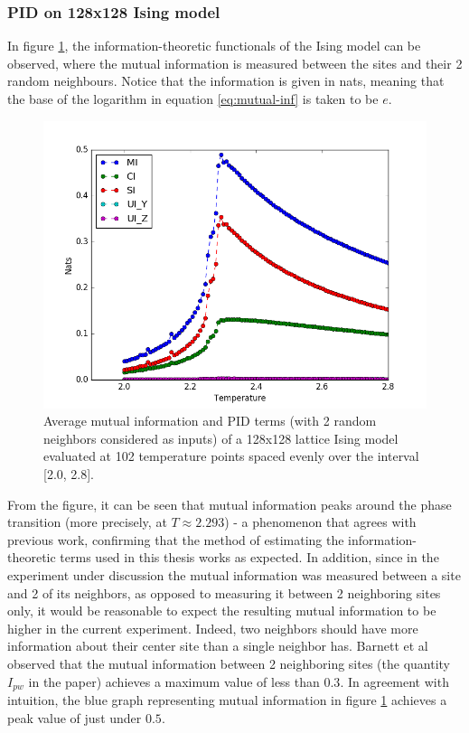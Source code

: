 \documentclass[12pt]{article}
\begin{document}
\subsubsection{PID on 128x128 Ising model}

In figure \ref{fig:ising-128-pid-2-nbs}, the information-theoretic functionals of the Ising model can be observed, where the mutual information is measured between the sites and their 2 random neighbours. Notice that the information is given in nats, meaning that the base of the logarithm in equation \ref{eq:mutual-inf} is taken to be $e$. 

\begin{figure} [h!]
\begin{center}
\includegraphics[width=.9\textwidth]{ising-128-pid-2-nbs}
\caption{Average mutual information and PID terms (with 2 random neighbors considered as inputs) of a 128x128 lattice Ising model evaluated at 102 temperature points spaced evenly over the interval [2.0, 2.8].}
\label{fig:ising-128-pid-2-nbs}
\end{center}
\end{figure}

From the figure, it can be seen that mutual information peaks around the phase transition (more precisely, at $T \approx 2.293$) - a phenomenon that agrees with previous work, confirming that the method of estimating the information-theoretic terms used in this thesis works as expected. In addition, since in the experiment under discussion the mutual information was measured between a site and 2 of its neighbors, as opposed to measuring it between 2 neighboring sites only, it would be reasonable to expect the resulting mutual information to be higher in the current experiment. Indeed, two neighbors should have more information about their center site than a single neighbor has. Barnett et al \cite{barnett-ising} observed that the mutual information between 2 neighboring sites (the quantity $I_{pw}$ in the paper) achieves a maximum value of less than $0.3$. In agreement with intuition, the blue graph representing mutual information in figure \ref{fig:ising-128-pid-2-nbs} achieves a peak value of just under $0.5$.
\end{document}
